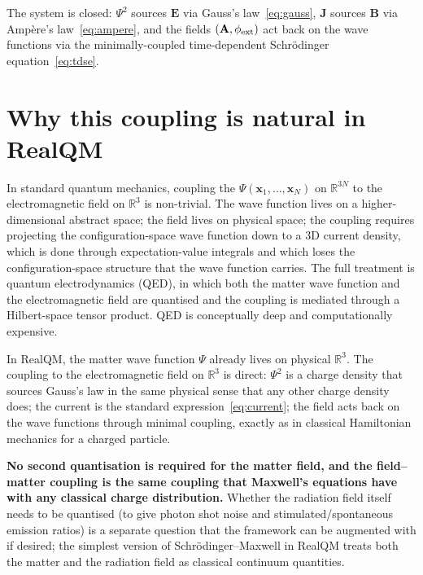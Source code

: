 The system is closed: $\Psi^2$ sources $\mathbf{E}$ via Gauss's law~\eqref{eq:gauss}, $\mathbf{J}$ sources $\mathbf{B}$ via Amp\`ere's law~\eqref{eq:ampere}, and the fields $(\mathbf{A}, \phi_{\rm ext})$ act back on the wave functions via the minimally-coupled time-dependent Schr\"odinger equation~\eqref{eq:tdse}.

\section{Why this coupling is natural in RealQM}\label{sec:sm-natural}

In standard quantum mechanics, coupling the $\Psi(\mathbf{x}_1, \ldots, \mathbf{x}_N)$ on $\mathbb{R}^{3N}$ to the electromagnetic field on $\mathbb{R}^3$ is non-trivial. The wave function lives on a higher-dimensional abstract space; the field lives on physical space; the coupling requires projecting the configuration-space wave function down to a 3D current density, which is done through expectation-value integrals and which loses the configuration-space structure that the wave function carries. The full treatment is quantum electrodynamics (QED), in which both the matter wave function and the electromagnetic field are quantised and the coupling is mediated through a Hilbert-space tensor product. QED is conceptually deep and computationally expensive.

In RealQM, the matter wave function $\Psi$ already lives on physical $\mathbb{R}^3$. The coupling to the electromagnetic field on $\mathbb{R}^3$ is direct: $\Psi^2$ is a charge density that sources Gauss's law in the same physical sense that any other charge density does; the current is the standard expression~\eqref{eq:current}; the field acts back on the wave functions through minimal coupling, exactly as in classical Hamiltonian mechanics for a charged particle.

\textbf{No second quantisation is required for the matter field, and the field--matter coupling is the same coupling that Maxwell's equations have with any classical charge distribution.} Whether the radiation field itself needs to be quantised (to give photon shot noise and stimulated/spontaneous emission ratios) is a separate question that the framework can be augmented with if desired; the simplest version of Schr\"odinger--Maxwell in RealQM treats both the matter and the radiation field as classical continuum quantities.

